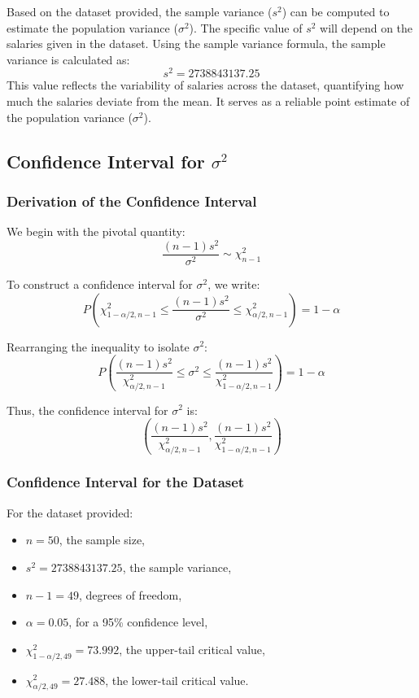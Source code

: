 \documentclass[12pt,a4paper]{article}
\begin{document}
Based on the dataset provided, the sample variance (\(s^2\)) can be computed to estimate the population variance (\(\sigma^2\)). The specific value of \(s^2\) will depend on the salaries given in the dataset. Using the sample variance formula, the sample variance is calculated as:
\[
s^2 = 2738843137.25
\]
This value reflects the variability of salaries across the dataset, quantifying how much the salaries deviate from the mean. It serves as a reliable point estimate of the population variance (\(\sigma^2\)).






\newpage

\subsection*{Confidence Interval for \(\sigma^2\)}

\subsubsection*{Derivation of the Confidence Interval}

We begin with the pivotal quantity:
\[
\frac{(n-1)s^2}{\sigma^2} \sim \chi^2_{n-1}
\]

To construct a confidence interval for \(\sigma^2\), we write:
\[
P\left( \chi^2_{1-\alpha/2, n-1} \leq \frac{(n-1)s^2}{\sigma^2} \leq \chi^2_{\alpha/2, n-1} \right) = 1-\alpha
\]

Rearranging the inequality to isolate \(\sigma^2\):
\[
P\left( \frac{(n-1)s^2}{\chi^2_{\alpha/2, n-1}} \leq \sigma^2 \leq \frac{(n-1)s^2}{\chi^2_{1-\alpha/2, n-1}} \right) = 1-\alpha
\]

Thus, the confidence interval for \(\sigma^2\) is:
\[
\left( \frac{(n-1)s^2}{\chi^2_{\alpha/2, n-1}}, \frac{(n-1)s^2}{\chi^2_{1-\alpha/2, n-1}} \right)
\]

\subsubsection*{Confidence Interval for the Dataset}

For the dataset provided:
\begin{itemize}
    \item \(n = 50\), the sample size,
    \item \(s^2 = 2738843137.25\), the sample variance,
    \item \(n-1 = 49\), degrees of freedom,
    \item \(\alpha = 0.05\), for a 95\% confidence level,
    \item \(\chi^2_{1-\alpha/2, 49} = 73.992\), the upper-tail critical value,
    \item \(\chi^2_{\alpha/2, 49} = 27.488\), the lower-tail critical value.
\end{itemize}
\end{document}
